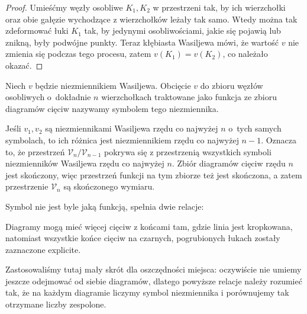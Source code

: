 \begin{proof}
    Umieśćmy węzły osobliwe $K_1, K_2$ w przestrzeni tak, by ich wierzchołki oraz obie gałęzie wychodzące z wierzchołków leżały tak samo. Wtedy można tak zdeformować łuki $K_1$ tak, by jedynymi osobliwościami, jakie się pojawią lub znikną, były podwójne punkty.
    Teraz kłębiasta Wasiljewa mówi, że wartość $v$ nie zmienia się podczas tego procesu, zatem $v(K_1) = v(K_2)$, co należało okazać.
\end{proof}

\begin{definition}
    Niech $v$ będzie niezmiennikiem Wasiljewa.
    Obcięcie $v$ do zbioru węzłów osobliwych o~dokładnie $n$ wierzchołkach traktowane jako funkcja ze zbioru diagramów cięciw nazywamy symbolem tego niezmiennika.
\end{definition}

Jeśli $v_1, v_2$ są niezmiennikami Wasiljewa rzędu co najwyżej $n$ o~tych samych symbolach, to ich różnica jest niezmiennikiem rzędu co najwyżej $n - 1$.
Oznacza to, że przestrzeń $\mathcal V_n/\mathcal V_{n-1}$ pokrywa się z przestrzenią wszystkich symboli niezmienników Wasiljewa rzędu co najwyżej $n$.
Zbiór diagramów cięciw rzędu $n$ jest skończony, więc przestrzeń funkcji na tym zbiorze też jest skończona, a zatem przestrzenie $\mathcal V_n$ są skończonego wymiaru.

Symbol nie jest byle jaką funkcją, spełnia dwie relacje:

Diagramy mogą mieć więcej cięciw z końcami tam, gdzie linia jest kropkowana, natomiast wszystkie końce cięciw na czarnych, pogrubionych łukach zostały zaznaczone explicite.

Zastosowaliśmy tutaj mały skrót dla oszczędności miejsca: oczywiście nie umiemy jeszcze odejmować od siebie diagramów, dlatego powyższe relacje należy rozumieć tak, że na każdym diagramie liczymy symbol niezmiennika i porównujemy tak otrzymane liczby zespolone.

